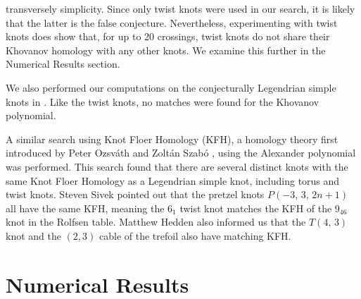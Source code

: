 \documentclass{article}
\theoremstyle{plain}
\begin{document}
        transversely simplicity. Since only twist knots were used in our
        search, it is likely that the latter is the false conjecture.
        Nevertheless, experimenting with twist knots does show that, for up to
        20 crossings, twist knots do not share their Khovanov homology with any
        other knots. We examine this further in the Numerical Results section.
        \par\hfill\par
        We also performed our computations on the conjecturally Legendrian
        simple knots in \cite{LegendrianKnotAtlas}. Like the twist knots,
        no matches were found for the Khovanov polynomial.
        \par\hfill\par
        A similar search using Knot Floer Homology (KFH), a homology theory
        first introduced by Peter Ozsv\'{a}th and Zolt\'{a}n Szab\'{o}
        \cite{OzsvathSzaboHolomorphicDisks2004}, using the Alexander polynomial
        was performed. This search found that there are several distinct knots
        with the same Knot Floer Homology as a Legendrian simple knot,
        including torus and twist knots. Steven Sivek pointed
        out that the pretzel knots $P(-3,\,3,\,2n+1)$ all have the same KFH,
        meaning the $6_{1}$ twist knot matches the KFH of the $9_{46}$
        knot in the Rolfsen table.
        Matthew Hedden also informed us that the $T(4,\,3)$ knot and the
        $(2,3)$ cable of the trefoil also have matching KFH.
    \section{Numerical Results}
\end{document}
